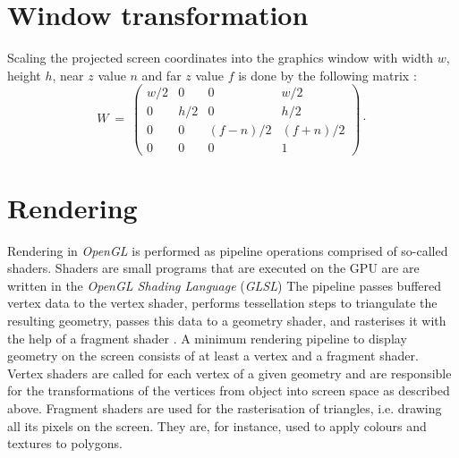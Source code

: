 \section{Window transformation}
\label{sec:gl_viewport}
Scaling the projected screen coordinates into the graphics window with width $w$, height $h$, near
$z$ value $n$ and far $z$ value $f$ is done by the following matrix \cite{web_gl_viewport}:
\begin{equation}
	W \ =\ 
	\left( \begin{array}{cccc} 
		w/2 &   0 &                  0 &                w/2 \\
		  0 & h/2 &                  0 &                h/2 \\
		  0 &   0 & \left(f-n\right)/2 & \left(f+n\right)/2 \\
		  0 &   0 &                  0 &                  1
	\end{array} \right) \cdot
\end{equation}



\section{Rendering}
\label{sec:gl_shaders}
Rendering in \textit{OpenGL} is performed as pipeline operations comprised of so-called shaders.
Shaders are small programs that are executed on the GPU are are written in the
\textit{OpenGL Shading Language} (\textit{GLSL}) \cite{wiki_glsl}
The pipeline passes buffered vertex data to the vertex shader, performs tessellation steps to triangulate
the resulting geometry, passes this data to a geometry shader, and rasterises it with the help
of a fragment shader \cite[p. 6]{Sellers2002}.
A minimum rendering pipeline to display geometry on the screen consists of at least a vertex and
a fragment shader.
Vertex shaders are called for each vertex of a given geometry and are responsible for the transformations
of the vertices from object into screen space as described above.
Fragment shaders are used for the rasterisation of triangles, i.e. drawing all its pixels on the screen. 
They are, for instance, used to apply colours and textures to polygons.

